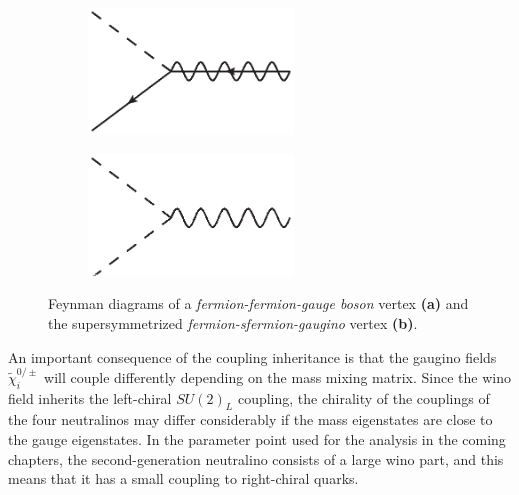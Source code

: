 \documentclass[twoside,english]{uiofysmaster}
\begin{document}
\begin{figure}[htbp]
	\begin{subfigure}[b]{0.45\textwidth}
		\centering
		\includegraphics[width=0.6\textwidth]{figures/susyintro/sfg_vertex.eps}
		\caption{ }
		\label{fig:feynmandiagram_supersymmetrization_b}
	\end{subfigure}
	\begin{subfigure}[b]{0.45\textwidth}
		\centering
		\includegraphics[width=0.6\textwidth]{figures/susyintro/ssg_vertex.eps}
		\caption{ }
		\label{fig:feynmandiagram_supersymmetrization_c}
	\end{subfigure}
	\caption{Feynman diagrams of a {\it fermion-fermion-gauge boson} vertex {\bf (a)} and the supersymmetrized {\it fermion-sfermion-gaugino} vertex {\bf (b)}.}
	\label{fig:feynmandiagram_supersymmetrization}
\end{figure}

An important consequence of the coupling inheritance is that the gaugino fields $\tilde\chi_i^{0/\pm}$ will couple differently depending on the mass mixing matrix. Since the wino field inherits the left-chiral $SU(2)_L$ coupling, the chirality of the couplings of the four neutralinos may differ considerably if the mass eigenstates are close to the gauge eigenstates. In the parameter point used for the analysis in the coming chapters, the second-generation neutralino consists of a large wino part, and this means that it has a small coupling to right-chiral quarks. 
\end{document}
